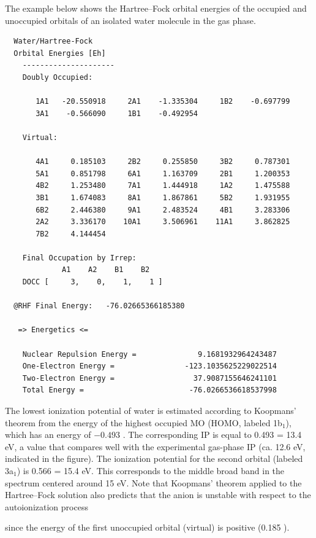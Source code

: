 \documentclass[../Main/notes.tex]{subfiles}
\begin{document}
The example below shows the Hartree--Fock orbital energies of the occupied and unoccupied orbitals of an isolated water molecule in the gas phase.
\begin{small}
\begin{verbatim}
  Water/Hartree-Fock
  Orbital Energies [Eh]
    ---------------------
    Doubly Occupied:                                                      

       1A1   -20.550918     2A1    -1.335304     1B2    -0.697799  
       3A1    -0.566090     1B1    -0.492954  

    Virtual:                                                              

       4A1     0.185103     2B2     0.255850     3B2     0.787301  
       5A1     0.851798     6A1     1.163709     2B1     1.200353  
       4B2     1.253480     7A1     1.444918     1A2     1.475588  
       3B1     1.674083     8A1     1.867861     5B2     1.931955  
       6B2     2.446380     9A1     2.483524     4B1     3.283306  
       2A2     3.336170    10A1     3.506961    11A1     3.862825  
       7B2     4.144454  

    Final Occupation by Irrep:
             A1    A2    B1    B2 
    DOCC [     3,    0,    1,    1 ]

  @RHF Final Energy:   -76.02665366185380

   => Energetics <=

    Nuclear Repulsion Energy =              9.1681932964243487
    One-Electron Energy =                -123.1035625229022514
    Two-Electron Energy =                  37.9087155646241101
    Total Energy =                        -76.0266536618537998
\end{verbatim}
\end{small}

The lowest ionization potential of water is estimated according to Koopmans' theorem from the energy of the highest occupied MO (HOMO, labeled 1b$_1$), which has an energy of $-0.493$ \Eh.
The corresponding IP is equal to 0.493 \Eh = 13.4 eV, a value that compares well with the experimental gas-phase IP (ca. 12.6 eV, indicated in the figure).
The ionization potential for the second orbital (labeled 3a$_1$) is 0.566 \Eh = 15.4 eV.
This corresponds to the  middle broad band in the spectrum centered around 15 eV.
Note that Koopmans' theorem applied to the Hartree--Fock solution also predicts that the anion  is unstable with respect to the autoionization process
\begin{center}
\end{center}
since the energy of the first unoccupied orbital (virtual) is positive (0.185 \Eh).
\end{document}
